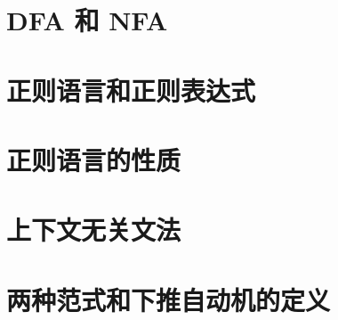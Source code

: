 \documentclass[12pt]{ctexbook}
\theoremstyle{definition}
\theoremstyle{remark}
\begin{document}
\tableofcontents
\chapter{DFA 和 NFA}
 
\chapter{正则语言和正则表达式}

\chapter{正则语言的性质} 

\chapter{上下文无关文法} 

\chapter{两种范式和下推自动机的定义}

\end{document}
